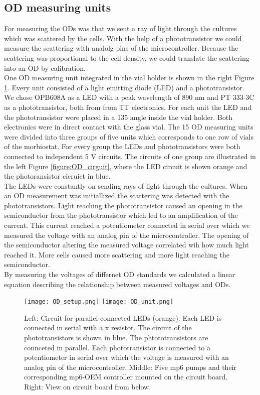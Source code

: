 \subsection{OD measuring units}
For measuring the ODs was that we sent a ray of light through the cultures which was scattered by the cells. With the help of a phototransistor we could measure the scattering with analolg pins of the microcontroller. Because the scattering was proportional to the cell density, we could translate the scattering into an OD by calibration. \\
One OD measuring unit integrated in the vial holder is shown in  the right Figure \ref{figure:OD_unit}. Every unit consisted of a light emitting diode (LED) and a phototransistor. We chose OPB608A as a LED with a peak wavelength of 890 nm and PT 333-3C as a phototransistor, both from from TT electronics. For each unit the LED and the phototransistor were placed in a 135 \degree \space angle inside the vial holder. Both electronics were in direct contact with the glass vial.
The 15 OD measuring units were divided into three groups of five units which corresponds to one row of vials of the morbiostat. For every group the LEDs and phototransistors were both connected to independent 5 V circuits. The circuits of one group are illustrated in the left Figure \ref{figure:OD_cirguit}, where the LED circuit is shown orange and the photoransistor cicruict in blue. \\
The LEDs were constantly on sending rays of light through the cultures. When an OD measurement was initiallized the scattering was detected with the phototransistors. Light reaching the phototransistor caused an opening in the semiconductor from the phototransistor which led to an amplification of the current. This current reached a potentiometer connected in serial over which we measured the voltage with an analog pin of the microcontroller. The opening of the semiconductor altering the measured voltage correlated wih how much light reached it. More cells caused more scattering and more light reaching the semiconductor.\\
By measuring the voltages of differnet OD standards we calculated a linear equation describing the relationship between measured voltages and ODs.
\label{section:OD}
\begin{figure}
	\texttt{[image: OD\_setup.png]}
	\texttt{[image: OD\_unit.png]}
	\caption{Left: Circuit for parallel connected LEDs (orange). Each LED is connected in serial with a x \textOmega \space resistor. The circuit of the phototransistors is shown in blue. The phtototransistors are connceted in parallel. Each phototransistor is connected to a potentiometer in serial over which the voltage is measured with an analog pin of the microcontroller. Middle: Five mp6 pumps and their corresponding mp6-OEM controller mounted on the circuit board. Right: View on circuit board from below.}
	\label{figure:OD_cirguit}
	\label{figure:OD_unit}
\end{figure}

